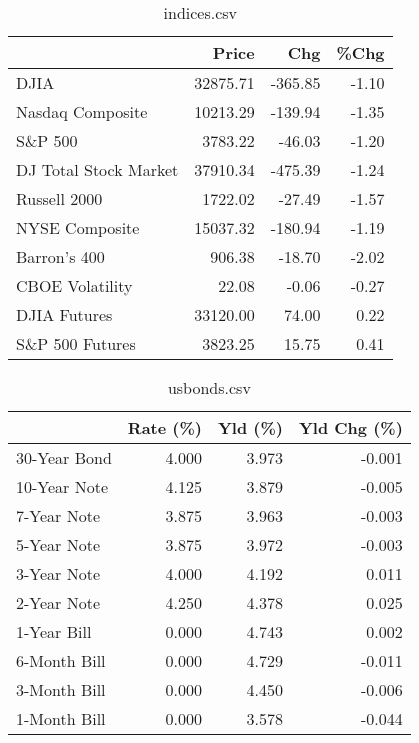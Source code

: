 \documentclass{article}%
\begin{document}
%


\begin{table}[htbp]%
\caption{indices.csv}%
\centering%
\begin{adjustbox}{width=1\textwidth}%
\begin{tabular}{lrrr}
\toprule
                      &    Price &     Chg &  \%Chg \\
\midrule
                 DJIA & 32875.71 & -365.85 & -1.10 \\
     Nasdaq Composite & 10213.29 & -139.94 & -1.35 \\
              S\&P 500 &  3783.22 &  -46.03 & -1.20 \\
DJ Total Stock Market & 37910.34 & -475.39 & -1.24 \\
         Russell 2000 &  1722.02 &  -27.49 & -1.57 \\
       NYSE Composite & 15037.32 & -180.94 & -1.19 \\
         Barron's 400 &   906.38 &  -18.70 & -2.02 \\
      CBOE Volatility &    22.08 &   -0.06 & -0.27 \\
         DJIA Futures & 33120.00 &   74.00 &  0.22 \\
      S\&P 500 Futures &  3823.25 &   15.75 &  0.41 \\
\bottomrule
\end{tabular}
%
\end{adjustbox}%
\end{table}

%


\begin{table}[htbp]%
\caption{usbonds.csv}%
\centering%
\begin{adjustbox}{width=1\textwidth}%
\begin{tabular}{lrrr}
\toprule
             &  Rate (\%) &  Yld (\%) &  Yld Chg (\%) \\
\midrule
30-Year Bond &     4.000 &    3.973 &       -0.001 \\
10-Year Note &     4.125 &    3.879 &       -0.005 \\
 7-Year Note &     3.875 &    3.963 &       -0.003 \\
 5-Year Note &     3.875 &    3.972 &       -0.003 \\
 3-Year Note &     4.000 &    4.192 &        0.011 \\
 2-Year Note &     4.250 &    4.378 &        0.025 \\
 1-Year Bill &     0.000 &    4.743 &        0.002 \\
6-Month Bill &     0.000 &    4.729 &       -0.011 \\
3-Month Bill &     0.000 &    4.450 &       -0.006 \\
1-Month Bill &     0.000 &    3.578 &       -0.044 \\
\bottomrule
\end{tabular}
%
\end{adjustbox}%
\end{table}
\end{document}
